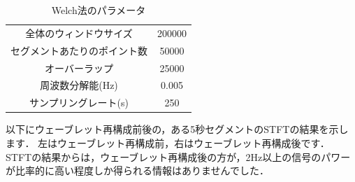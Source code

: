 \documentclass[dvipdfmx]{jsarticle}
\begin{document}
\begin{table}[H]
\caption{Welch法のパラメータ}
\centering
\begin{tabular}{cc}
\hline
全体のウィンドウサイズ & 200000 \\
セグメントあたりのポイント数 & 50000 \\
オーバーラップ & 25000 \\
周波数分解能(Hz) & 0.005 \\
サンプリングレート(s) & 250 \\
\hline
\end{tabular}
\end{table}

\newpage

以下にウェーブレット再構成前後の，ある5秒セグメントのSTFTの結果を示します．
左はウェーブレット再構成前，右はウェーブレット再構成後です．
STFTの結果からは，ウェーブレット再構成後の方が，2Hz以上の信号のパワーが比率的に高い程度しか得られる情報はありませんでした．
\end{document}
